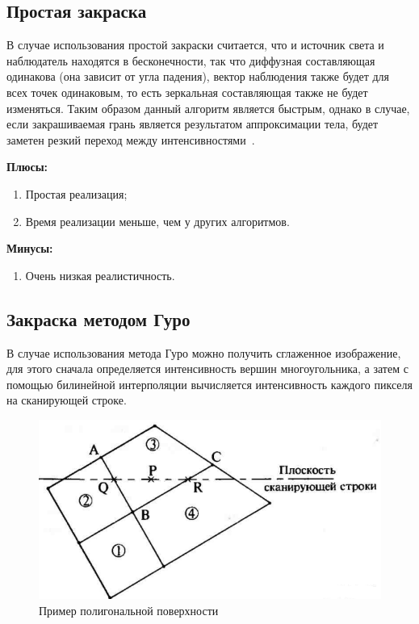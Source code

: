 \subsection{Простая закраска}
В случае использования простой закраски считается, что и источник света и наблюдатель находятся в бесконечности,
так что диффузная составляющая одинакова (она зависит от угла падения), вектор наблюдения также будет для всех точек одинаковым, то есть зеркальная составляющая также не будет изменяться. 
Таким образом данный алгоритм является быстрым, однако в случае, если закрашиваемая грань является результатом аппроксимации тела, будет заметен резкий переход между интенсивностями~\cite{Rodgers}.

\textbf{Плюсы:}
\begin{enumerate}
	\item Простая реализация;
	\item Время реализации меньше, чем у других алгоритмов.
\end{enumerate}

\textbf{Минусы:}
\begin{enumerate}
	\item Очень низкая реалистичность.
\end{enumerate}


\subsection{Закраска методом Гуро}
В случае использования метода Гуро можно получить сглаженное изображение, для этого сначала определяется интенсивность вершин многоугольника, а
затем с помощью билинейной интерполяции вычисляется интенсивность каждого пикселя на сканирующей строке.

\begin{figure}[H]
	\centering
	\includegraphics{images/guro.png}
	\caption{Пример полигональной поверхности}
	\label{fig:guro_polygon}
\end{figure} 

